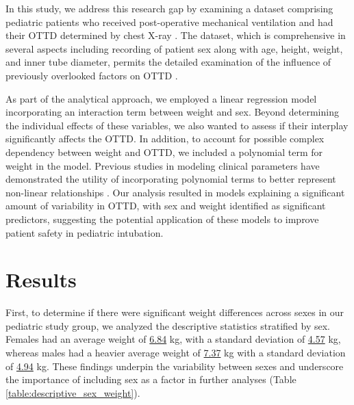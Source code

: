 \documentclass[11pt]{article}
\begin{document}
In this study, we address this research gap by examining a dataset comprising pediatric patients who received post-operative mechanical ventilation and had their OTTD determined by chest X-ray \cite{Saran2014ComparisonOI}. The dataset, which is comprehensive in several aspects including recording of patient sex along with age, height, weight, and inner tube diameter, permits the detailed examination of the influence of previously overlooked factors on OTTD \cite{Fuller2021UpdateOP}.

As part of the analytical approach, we employed a linear regression model incorporating an interaction term between weight and sex. Beyond determining the individual effects of these variables, we also wanted to assess if their interplay significantly affects the OTTD. In addition, to account for possible complex dependency between weight and OTTD, we included a polynomial term for weight in the model. Previous studies in modeling clinical parameters have demonstrated the utility of incorporating polynomial terms to better represent non-linear relationships \cite{Makhoul2001FrequencyOC}. Our analysis resulted in models explaining a significant amount of variability in OTTD, with sex and weight identified as significant predictors, suggesting the potential application of these models to improve patient safety in pediatric intubation.

\section*{Results}

First, to determine if there were significant weight differences across sexes in our pediatric study group, we analyzed the descriptive statistics stratified by sex. Females had an average weight of \hyperlink{A0b}{6.84} kg, with a standard deviation of \hyperlink{A0c}{4.57} kg, whereas males had a heavier average weight of \hyperlink{A1b}{7.37} kg with a standard deviation of \hyperlink{A1c}{4.94} kg. These findings underpin the variability between sexes and underscore the importance of including sex as a factor in further analyses (Table {}\ref{table:descriptive_sex_weight}).
\end{document}
